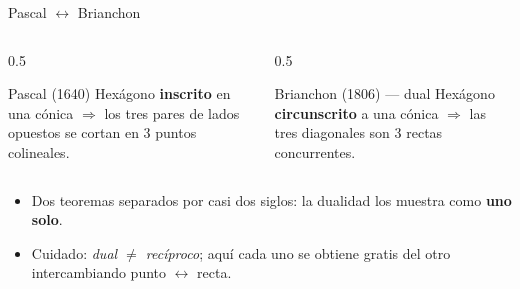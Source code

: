 \documentclass[aspectratio=169]{beamer}
\begin{document}
\begin{frame}{Pascal $\leftrightarrow$ Brianchon}
  \begin{columns}[T]
    \begin{column}{0.5\textwidth}
      \begin{block}{Pascal (1640)}
        Hexágono \textbf{inscrito} en una cónica $\Rightarrow$ los tres pares
        de lados opuestos se cortan en \alert{3 puntos colineales}.
      \end{block}
    \end{column}
    \begin{column}{0.5\textwidth}
      \begin{block}{Brianchon (1806) — dual}
        Hexágono \textbf{circunscrito} a una cónica $\Rightarrow$ las tres
        diagonales son \alert{3 rectas concurrentes}.
      \end{block}
    \end{column}
  \end{columns}
  \vspace{0.4cm}
  \begin{itemize}
    \item Dos teoremas separados por casi dos siglos: la dualidad los muestra
          como \textbf{uno solo}.
    \item Cuidado: \emph{dual $\neq$ recíproco}; aquí cada uno se obtiene
          gratis del otro intercambiando punto $\leftrightarrow$ recta.
  \end{itemize}
\end{frame}
\end{document}
